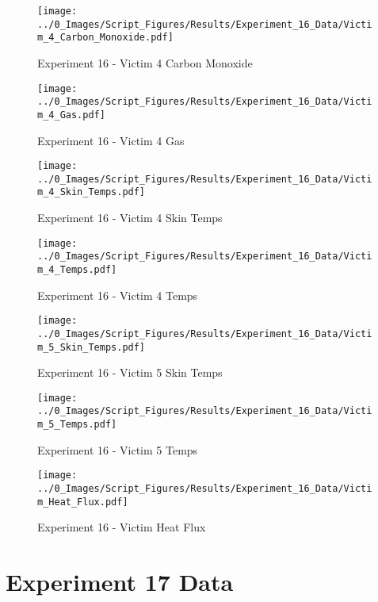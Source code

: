 	\clearpage

	\begin{figure}[H]
		\centering
		\texttt{[image: ../0\_Images/Script\_Figures/Results/Experiment\_16\_Data/Victim\_4\_Carbon\_Monoxide.pdf]}
		\caption[]{Experiment 16 - Victim 4 Carbon Monoxide}
	\end{figure}
 

	\begin{figure}[H]
		\centering
		\texttt{[image: ../0\_Images/Script\_Figures/Results/Experiment\_16\_Data/Victim\_4\_Gas.pdf]}
		\caption[]{Experiment 16 - Victim 4 Gas}
	\end{figure}
 
	\clearpage

	\begin{figure}[H]
		\centering
		\texttt{[image: ../0\_Images/Script\_Figures/Results/Experiment\_16\_Data/Victim\_4\_Skin\_Temps.pdf]}
		\caption[]{Experiment 16 - Victim 4 Skin Temps}
	\end{figure}
 

	\begin{figure}[H]
		\centering
		\texttt{[image: ../0\_Images/Script\_Figures/Results/Experiment\_16\_Data/Victim\_4\_Temps.pdf]}
		\caption[]{Experiment 16 - Victim 4 Temps}
	\end{figure}
 
	\clearpage

	\begin{figure}[H]
		\centering
		\texttt{[image: ../0\_Images/Script\_Figures/Results/Experiment\_16\_Data/Victim\_5\_Skin\_Temps.pdf]}
		\caption[]{Experiment 16 - Victim 5 Skin Temps}
	\end{figure}
 

	\begin{figure}[H]
		\centering
		\texttt{[image: ../0\_Images/Script\_Figures/Results/Experiment\_16\_Data/Victim\_5\_Temps.pdf]}
		\caption[]{Experiment 16 - Victim 5 Temps}
	\end{figure}
 
	\clearpage

	\begin{figure}[H]
		\centering
		\texttt{[image: ../0\_Images/Script\_Figures/Results/Experiment\_16\_Data/Victim\_Heat\_Flux.pdf]}
		\caption[]{Experiment 16 - Victim Heat Flux}
	\end{figure}
 

\clearpage		\large
\section{Experiment 17 Data} \label{App:Exp17Results} 


